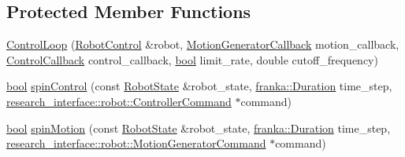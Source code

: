 \subsection*{Protected Member Functions}
\begin{DoxyCompactItemize}
\item 
\hyperlink{classfranka_1_1ControlLoop_aecc26183c892cb2c1d125e5c14486bae}{Control\+Loop} (\hyperlink{classfranka_1_1RobotControl}{Robot\+Control} \&robot, \hyperlink{classfranka_1_1ControlLoop_a23624d5a86fe2b206986af4757ba1822}{Motion\+Generator\+Callback} motion\+\_\+callback, \hyperlink{classfranka_1_1ControlLoop_a1b050245c6f2795d491899440f95cec3}{Control\+Callback} control\+\_\+callback, \hyperlink{classbool}{bool} limit\+\_\+rate, double cutoff\+\_\+frequency)
\item 
\hyperlink{classbool}{bool} \hyperlink{classfranka_1_1ControlLoop_a480c19a57bf2a7df4ab9c6f68667b865}{spin\+Control} (const \hyperlink{structfranka_1_1RobotState}{Robot\+State} \&robot\+\_\+state, \hyperlink{classfranka_1_1Duration}{franka\+::\+Duration} time\+\_\+step, \hyperlink{structresearch__interface_1_1robot_1_1ControllerCommand}{research\+\_\+interface\+::robot\+::\+Controller\+Command} $\ast$command)
\item 
\hyperlink{classbool}{bool} \hyperlink{classfranka_1_1ControlLoop_abec82e0ac5015ccc5fb078851ecae381}{spin\+Motion} (const \hyperlink{structfranka_1_1RobotState}{Robot\+State} \&robot\+\_\+state, \hyperlink{classfranka_1_1Duration}{franka\+::\+Duration} time\+\_\+step, \hyperlink{structresearch__interface_1_1robot_1_1MotionGeneratorCommand}{research\+\_\+interface\+::robot\+::\+Motion\+Generator\+Command} $\ast$command)
\end{DoxyCompactItemize}
